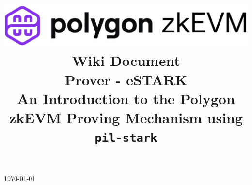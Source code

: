 \documentclass[preprint]{iacrtrans}
\title{
  \includegraphics[width=\columnwidth]{logo_zkEVM.png} \\ \vspace{0.3cm}
  Wiki Document\\ \vspace{0.3cm}
  Prover - eSTARK\\ \vspace{0.3cm}
  An Introduction to the Polygon zkEVM Proving Mechanism using \texttt{pil-stark} \\
  \version
}
\institute{}
\theoremstyle{definition}
\begin{document}
\begin{titlepage}
\centering
\maketitle
\today
\end{titlepage}



\newpage


\newpage



\newpage
\appendix
\end{document}
